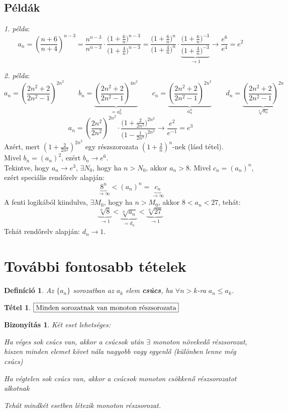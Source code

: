 \documentclass[a4paper,12pt,twoside]{book}
\newtheorem{tetel}{Tétel}[chapter]
\newtheorem{defi}{Definíció}[chapter]
\theoremstyle{break}
\newtheorem{biz}{Bizonyítás}[chapter]
\theoremstyle{plain}
\begin{document}
\subsection{Példák}

\emph{1. példa}:
\[a_n = \left(\frac{n+6}{n+4}\right)^{n-3} = \frac{n^{n-3}}{n^{n-3}}\cdot\frac{\big(1+\frac{6}{n}\big)^{n-3}}{\big(1+\frac{4}{n}\big)^{n-3}} = \frac{\big(1+\frac{6}{n}\big)^{n}}{\big(1+\frac{4}{n}\big)^{n}}\cdot \underbrace{\frac{\big(1+\frac{6}{n}\big)^{-3}}{\big(1+\frac{4}{n}\big)^{-3}}}_{\to 1} \to \frac{e^6}{e^4} = e^2 \]

\emph{2. példa}:
\[a_n = \left(\frac{2n^2+2}{2n^2-1}\right)^{2n^2} \qquad b_n = \underbrace{\left(\frac{2n^2+2}{2n^2-1}\right)^{4n^2}}_{=a_n^2} \qquad c_n = \underbrace{\left(\frac{2n^2+2}{2n^2-1}\right)^{2n^3}}_{a_n^n} \qquad d_n = \underbrace{\left(\frac{2n^2+2}{2n^2-1}\right)^{2n}}_{\sqrt[n]{a_n}}\]
\[a_n =  \left(\frac{2n^2}{2n^2}\right)^{2n^2}\cdot \frac{\Big(1+\frac{2}{2n^2}\Big)^{2n^2}}{\Big(1-\frac{1}{2n^2}\Big)^{2n^2}} \to \frac{e^2}{e^{-1}} = e^3\]
Azért, mert $\displaystyle \left(1+\frac{2}{2n^2}\right)^{2n^2}$ egy részszorozata $\displaystyle \left(1+\frac{2}{n}\right)^{n}$-nek (lásd  tétel).\\
Mivel $b_n = (a_n)^2$, ezért $b_n \to e^6$.\\
Tekintve, hogy $a_n \to e^3$, $\exists N_0$, hogy ha $n>N_0$, akkor $a_n > 8$. Mivel $c_n = (a_n)^n$, ezért speciális rendőrelv alapján:
\[\underbrace{8^n}_{\to \infty} < (a_n)^n = \underbrace{c_n}_{\to\infty}\]
A fenti logikából kiindulva, $\exists M_0$, hogy ha $n>M_0$, akkor $8< a_n < 27$, tehát:
\[\underbrace{\sqrt[n]{8}}_{\to 1} < \underbrace{\sqrt[n]{a_n}}_{=d_n} < \underbrace{\sqrt[n]{27}}_{\to 1}\]
Tehát rendőrelv alapján: $d_n\to 1$.

\section{További fontosabb tételek}

\begin{defi}
 Az $\{a_n\}$ sorozatban az $a_k$ elem \textbf{csúcs}, ha $\forall n>k$-ra $a_n\leqslant a_k$.
\end{defi}

\begin{tetel}
 $\boxed{$Minden sorozatnak van monoton részsorozata$}$
\end{tetel}
\begin{biz}
 Két eset lehetséges: \begin{enumerate*}
  \item Ha véges sok csúcs van, akkor a csúcsok után $\exists$ monoton növekedő részsorozat, hiszen minden elemet követ nála nagyobb vagy egyenlő (különben lenne még csúcs)
  \item Ha végtelen sok csúcs van, akkor a csúcsok monoton csökkenő részsorozatot alkotnak
 \end{enumerate*}
 Tehát mindkét esetben létezik monoton részsorozat.
\end{biz}
\end{document}
